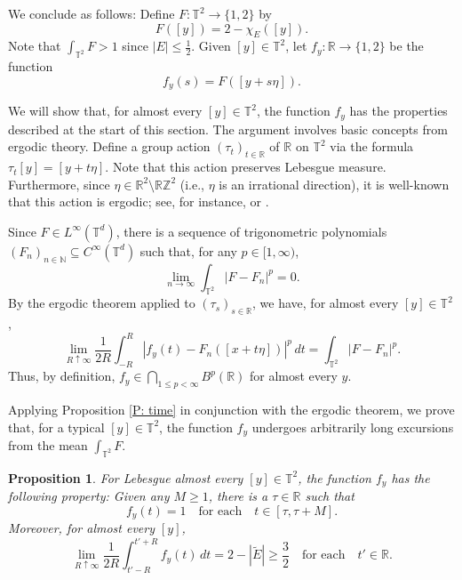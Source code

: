 \documentclass[12pt]{amsart}
\newtheorem{prop}{Proposition}
\begin{document}
	We conclude as follows: Define $F : \mathbb{T}^{2} \to \{1,2\}$ by 
		\begin{equation*}
			F([y]) = 2 - \chi_{E}([y]).
		\end{equation*}
	Note that $\int_{\mathbb{T}^{2}} F > 1$ since $|E| \leq \frac{1}{2}$.  Given $[y] \in \mathbb{T}^{2}$, let $f_{y} : \mathbb{R} \to \{1,2\}$ be the function
		\begin{equation*}
			f_{y}(s) = F([y + s\eta]).
		\end{equation*}
	
	We will show that, for almost every $[y] \in \mathbb{T}^{2}$, the function $f_{y}$ has the properties described at the start of this section.  The argument involves basic concepts from ergodic theory.  Define a group action $(\tau_{t})_{t \in \mathbb{R}}$ of $\mathbb{R}$ on $\mathbb{T}^{2}$ via the formula $\tau_{t}[y] = [y + t \eta]$.  Note that this action preserves Lebesgue measure.  Furthermore, since $\eta \in \mathbb{R}^{2} \setminus \mathbb{R} \mathbb{Z}^{2}$ (i.e., $\eta$ is an irrational direction), it is well-known that this action is ergodic; see, for instance, \cite[Section 2.4]{morfe_thesis} or \cite[Appendix B.1]{morfe_variational}.
	
	
	Since $F \in L^{\infty}(\mathbb{T}^{d})$, there is a sequence of trigonometric polynomials $(F_{n})_{n \in \mathbb{N}} \subseteq C^{\infty}(\mathbb{T}^{d})$ such that, for any $p \in [1,\infty)$,
		\begin{equation*}
			\lim_{n \to \infty} \int_{\mathbb{T}^{2}} |F - F_{n}|^{p} = 0.
		\end{equation*}
	By the ergodic theorem applied to $(\tau_{s})_{s \in \mathbb{R}}$, we have, for almost every $[y] \in \mathbb{T}^{2}$,
		\begin{equation} \label{E: ergodic thing}
			\lim_{R \uparrow \infty} \frac{1}{2R} \int_{-R}^{R} |f_{y}(t) - F_{n}([x + t \eta])|^{p} \, dt = \int_{\mathbb{T}^{2}} |F - F_{n}|^{p}.
		\end{equation}
	Thus, by definition, $f_{y} \in \bigcap_{1 \leq p < \infty} B^{p}(\mathbb{R})$ for almost every $y$.
	
	Applying Proposition \ref{P: time} in conjunction with the ergodic theorem, we prove that, for a typical $[y] \in \mathbb{T}^{2}$, the function $f_{y}$ undergoes arbitrarily long excursions from the mean $\int_{\mathbb{T}^{2}} F$. 
	
		\begin{prop} \label{P: quasiperiodic example done} For Lebesgue almost every $[y] \in \mathbb{T}^{2}$, the function $f_{y}$ has the following property: Given any $M \geq 1$, there is a $\tau \in \mathbb{R}$ such that 
			\begin{equation*}
				f_{y}(t) = 1 \quad \text{for each} \quad t \in [\tau,\tau + M].
			\end{equation*}
		Moreover, for almost every $[y]$,
			\begin{equation} \label{E: mean property}
				\lim_{R \uparrow \infty} \frac{1}{2R} \int_{t' -R}^{t' + R} f_{y}(t) \, dt = 2 - |\tilde{E}| \geq \frac{3}{2} \quad \text{for each} \quad t' \in \mathbb{R}.
			\end{equation}
		\end{prop}
		
\end{document}

